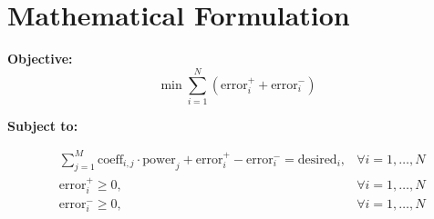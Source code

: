 \documentclass{article}
\begin{document}
\section*{Mathematical Formulation}

\textbf{Objective:}
\[
\min \sum_{i=1}^{N} (\text{error}_i^+ + \text{error}_i^-)
\]

\textbf{Subject to:}

\begin{align*}
& \sum_{j=1}^{M} \text{coeff}_{i,j} \cdot \text{power}_j + \text{error}_i^+ - \text{error}_i^- = \text{desired}_i, & \forall i = 1, \ldots, N \\
& \text{error}_i^+ \geq 0, & \forall i = 1, \ldots, N \\
& \text{error}_i^- \geq 0, & \forall i = 1, \ldots, N \\
\end{align*}
\end{document}
